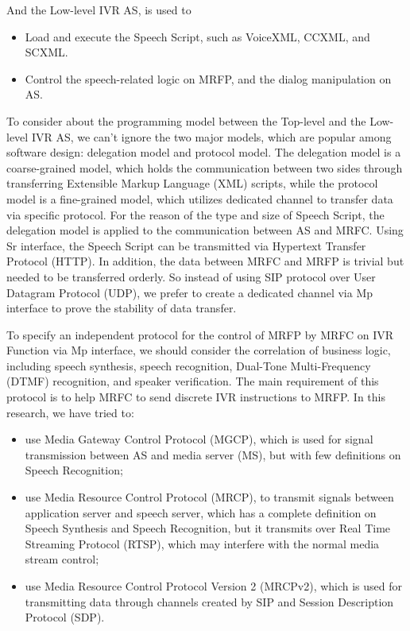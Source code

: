 \documentclass[10pt, conference, a4paper]{IEEEtran}
\begin{document}
And the Low-level IVR AS, is used to
\begin{itemize}
\item Load and execute the Speech Script, such as VoiceXML\cite{misc:voice.extensible.markup.language}, CCXML\cite{misc:voice.browser.call.control}, and SCXML\cite{misc:state.chart.xml}.
\item Control the speech-related logic on MRFP, and the dialog manipulation on AS.
\end{itemize}

To consider about the programming model between the Top-level and the Low-level IVR AS, we can't ignore the two major models, which are popular among software design: delegation model and protocol model. The delegation model is a coarse-grained model, which holds the communication between two sides through transferring Extensible Markup Language (XML) scripts, while the protocol model is a fine-grained model, which utilizes dedicated channel to transfer data via specific protocol. For the reason of the type and size of Speech Script, the delegation model is applied to the communication between AS and MRFC. Using Sr interface, the Speech Script can be transmitted via Hypertext Transfer Protocol (HTTP). In addition, the data between MRFC and MRFP is trivial but needed to be transferred orderly. So instead of using SIP protocol over User Datagram Protocol (UDP), we prefer to create a dedicated channel via Mp interface to prove the stability of data transfer.

To specify an independent protocol for the control of MRFP by MRFC on IVR Function via Mp interface, we should consider the correlation of business logic, including speech synthesis, speech recognition, Dual-Tone Multi-Frequency (DTMF) recognition, and speaker verification. The main requirement of this protocol is to help MRFC to send discrete IVR instructions to MRFP. In this research, we have tried to:

\begin{itemize}
\item use Media Gateway Control Protocol (MGCP)\cite{misc:rfc3435}, which is used for signal transmission between AS and media server (MS), but with few definitions on Speech Recognition;
\item use Media Resource Control Protocol (MRCP)\cite{misc:rfc4463}, to transmit signals between application server and speech server, which has a complete definition on Speech Synthesis and Speech Recognition, but it transmits over Real Time Streaming Protocol (RTSP), which may interfere with the normal media stream control;
\item use Media Resource Control Protocol Version 2 (MRCPv2)\cite{misc:rfc6787}, which is used for transmitting data through channels created by SIP and Session Description Protocol (SDP).
\end{itemize}
\end{document}
